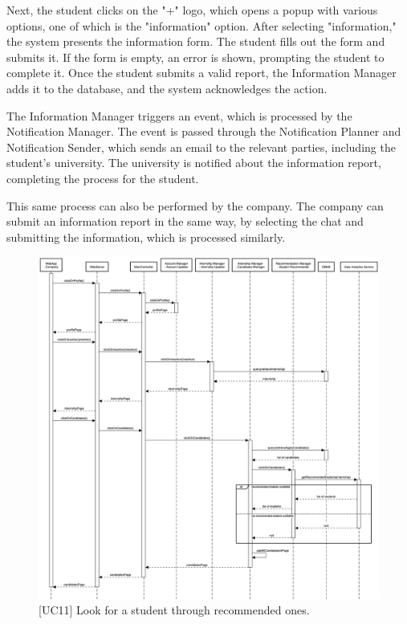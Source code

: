 Next, the student clicks on the "+" logo, which opens a popup with various options, one of which is the "information" option. After selecting "information," the system presents the information form. The student fills out the form and submits it. If the form is empty, an error is shown, prompting the student to complete it. Once the student submits a valid report, the Information Manager adds it to the database, and the system acknowledges the action.

The Information Manager triggers an event, which is processed by the Notification Manager. The event is passed through the Notification Planner and Notification Sender, which sends an email to the relevant parties, including the student's university. The university is notified about the information report, completing the process for the student.

This same process can also be performed by the company. The company can submit an information report in the same way, by selecting the chat and submitting the information, which is processed similarly.

\begin{figure}[htbp]
    \centering
    \includegraphics[width=\linewidth]{DD/Images/sequenceDiagrams/LookForRecommendedStudents.png}
    \caption{[UC11] Look for a student through recommended ones.}
    \label{fig:lookFrRecStudent_immagine}
\end{figure}
\clearpage


